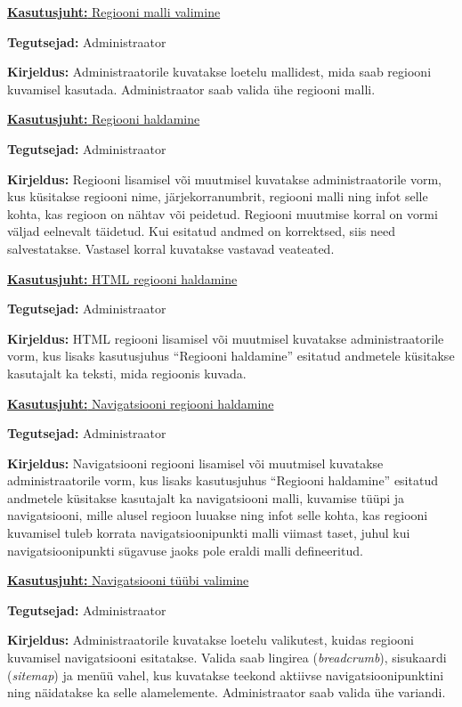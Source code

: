 \documentclass[a4paper,12pt]{article} %
\begin{document}
\underline{\textbf{Kasutusjuht:} Regiooni malli valimine}
\par
\textbf{Tegutsejad:} Administraator
\par
\textbf{Kirjeldus:} Administraatorile kuvatakse loetelu mallidest, mida saab regiooni kuvamisel kasutada. Administraator saab valida ühe regiooni malli.

\underline{\textbf{Kasutusjuht:} Regiooni haldamine}
\par
\textbf{Tegutsejad:} Administraator
\par
\textbf{Kirjeldus:} Regiooni lisamisel või muutmisel kuvatakse administraatorile vorm, kus küsitakse regiooni nime, järjekorranumbrit, regiooni malli ning infot selle kohta, kas regioon on nähtav või peidetud. Regiooni muutmise korral on vormi väljad eelnevalt täidetud. Kui esitatud andmed on korrektsed, siis need salvestatakse. Vastasel korral kuvatakse vastavad veateated.

\underline{\textbf{Kasutusjuht:} HTML regiooni haldamine}
\par
\textbf{Tegutsejad:} Administraator
\par
\textbf{Kirjeldus:} HTML regiooni lisamisel või muutmisel kuvatakse administraatorile vorm, kus lisaks kasutusjuhus ``Regiooni haldamine'' esitatud andmetele küsitakse kasutajalt ka teksti, mida regioonis kuvada.

\underline{\textbf{Kasutusjuht:} Navigatsiooni regiooni haldamine}
\par
\textbf{Tegutsejad:} Administraator
\par
\textbf{Kirjeldus:} Navigatsiooni regiooni lisamisel või muutmisel kuvatakse administraatorile vorm, kus lisaks kasutusjuhus ``Regiooni haldamine'' esitatud andmetele küsitakse kasutajalt ka navigatsiooni malli, kuvamise tüüpi ja navigatsiooni, mille alusel regioon luuakse ning infot selle kohta, kas regiooni kuvamisel tuleb korrata navigatsioonipunkti malli viimast taset, juhul kui navigatsioonipunkti sügavuse jaoks pole eraldi malli defineeritud.

\underline{\textbf{Kasutusjuht:} Navigatsiooni tüübi valimine}
\par
\textbf{Tegutsejad:} Administraator
\par
\textbf{Kirjeldus:} Administraatorile kuvatakse loetelu valikutest, kuidas regiooni kuvamisel navigatsiooni esitatakse. Valida saab lingirea (\textit{breadcrumb}), sisukaardi (\textit{sitemap}) ja menüü vahel, kus kuvatakse teekond aktiivse navigatsioonipunktini ning näidatakse ka selle alamelemente. Administraator saab valida ühe variandi.
\end{document}
